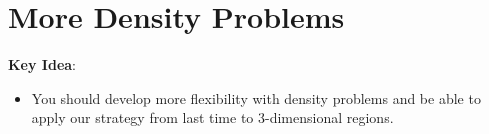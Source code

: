 \documentclass[main]{subfiles}
\begin{document}
\ifSubfilesClassLoaded{%
  \chaptermark{\chaptersix}
}{}

\section{More Density Problems} \label{ws6-7}

\begin{problemonly}
    \begin{framed}

\textbf{Key Idea}:

\begin{itemize}[topsep=0pt,partopsep=0pt,parsep=8pt,itemsep=0pt]


\item You should develop more flexibility with density problems and be
  able to apply our strategy from last time to 3-dimensional regions.

\end{itemize}
\end{framed}
\end{problemonly}
\end{document}
